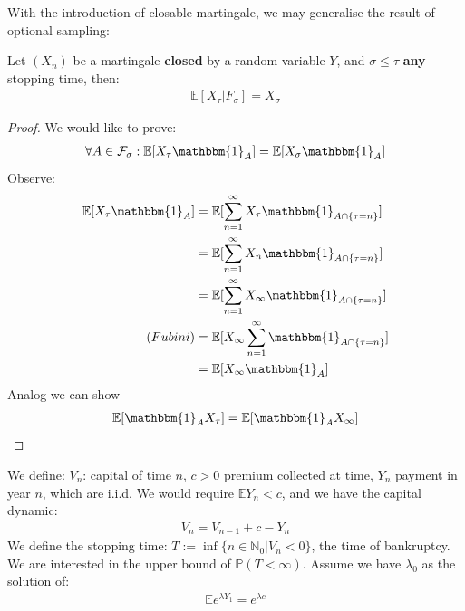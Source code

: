 With the introduction of closable martingale, we may generalise the result of optional sampling:

\begin{theorem}
	Let $(X_n)$ be a martingale \textbf{closed} by a random variable $Y$, and $\sigma \leq \tau$ \textbf{any }stopping time, then:
	\begin{align*}
		\mathbb{E}[X_\tau|F_\sigma] = X_\sigma
	\end{align*}
\end{theorem}
\begin{proof}
We would like to prove:
\begin{align*}
	\forall A \in \mathcal{F}_\sigma: \mathbb{E}[X_\tau \mathbbm{1}_A] = \mathbb{E}[X_\sigma \mathbbm{1}_A]
\end{align*}
Observe:
\begin{align*}
	\mathbb{E}[X_\tau\mathbbm{1}_A] &= \mathbb{E}[\sum_{n = 1}^\infty X_\tau \mathbbm{1}_{A \cap \{\tau = n\}}] \\
	&= \mathbb{E}[\sum_{n = 1}^\infty X_n \mathbbm{1}_{A \cap \{\tau = n\}}]\\
	&= \mathbb{E}[\sum_{n = 1}^\infty X_\infty \mathbbm{1}_{A \cap \{\tau = n\}}]\\
	(Fubini)
	&= \mathbb{E}[X_\infty \sum_{n = 1}^\infty \mathbbm{1}_{A \cap \{\tau = n\}}]\\
	&= \mathbb{E}[X_\infty \mathbbm{1}_A]
\end{align*}
Analog we can show
\begin{align*}
	\mathbb{E}[\mathbbm{1}_{A}X_\tau] = \mathbb{E}[\mathbbm{1}_{A}X_\infty]
\end{align*}
\end{proof}


\begin{example}
We define: $V_n$: capital of time $n$, $c > 0$ premium collected at time, $Y_n$ payment in year $n$, which are i.i.d. We would require $\mathbb{E}Y_n < c$, and we have the capital dynamic:
\begin{align*}
	V_n = V_{n-1} + c - Y_n
\end{align*} 
We define the stopping time: $T := \inf \{ n \in \mathbb{N}_0 |V_n < 0\}$, the time of bankruptcy. We are interested in the upper bound of $\mathbb{P}(T < \infty)$. Assume we have $\lambda_0$ as the solution of:
\begin{align*}
	\mathbb{E} e^{\lambda Y_1} = e^{\lambda c}
\end{align*}
\end{example}


